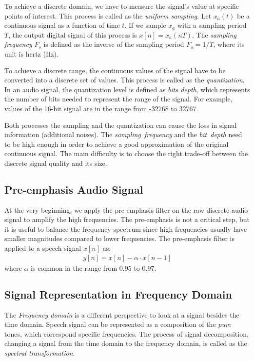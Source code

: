 To achieve a discrete domain, we have to measure the signal's value at specific points of interest.
This process is called as the \textit{uniform sampling}.
Let $x_a(t)$ be a continuous signal as a function of time $t$.
If we sample $x_a$ with a sampling period $T$, the output digital signal of this process is $x[n] = x_a(nT)$.
The \textit{sampling frequency} $F_s$ is defined as the inverse of the sampling period $F_s = 1/T$,
where its unit is hertz (Hz).

To achieve a discrete range, the continuous values of the signal have to be converted into a discrete set of values.
This process is called as the \textit{quantization}.
In an audio signal, the quantization level is defined as \textit{bits depth},
which represents the number of bits needed to represent the range of the signal.
For example, values of the 16-bit signal are in the range from -32768 to 32767.

Both processes the sampling and the quantization can cause the loss in signal information (additional noises).
The \textit{sampling~frequency} and the \textit{bit~depth} need to be high enough in order to achieve
a good approximation of the original continuous signal.
The main difficulty is to choose the right trade-off between the discrete signal quality and its size.


\subsection*{Pre-emphasis Audio Signal}
At the very beginning, we apply the pre-emphasis filter on the raw discrete audio signal to amplify the high frequencies.
The pre-emphasis is not a critical step, but it is useful to balance the frequency spectrum
since high frequencies usually have smaller magnitudes compared to lower frequencies.
The pre-emphasis filter is applied to a speech signal $x[n]$ as:
\begin{align}
y[n] = x[n] - \alpha \cdot x[n-1]
\end{align}
where $\alpha$ is common in the range from 0.95 to 0.97.


\subsection*{Signal Representation in Frequency Domain}

The \textit{Frequency domain} is a different perspective to look at a signal
besides the time domain.
Speech signal can be represented as a composition of
the \textit{pure} tones, which correspond specific frequencies.
The process of signal decomposition, changing a signal from the time domain to the frequency domain,
is called as the \textit{spectral transformation}.

